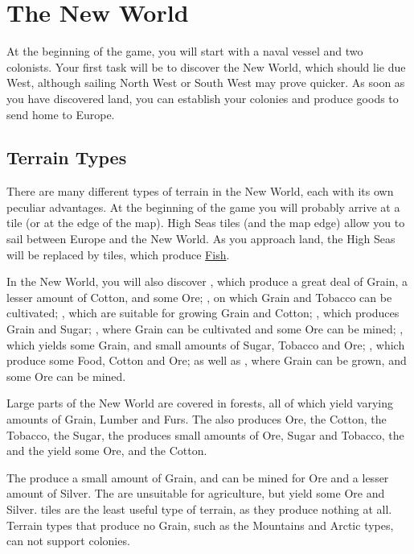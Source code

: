 \documentclass[12pt]{book}
\begin{document}
\hypertarget{The New World}{\chapter{The New World}}

At the beginning of the game, you will start with a naval vessel and
two colonists. Your first task will be to discover the New World,
which should lie due West, although sailing North West or South West
may prove quicker. As soon as you have discovered land, you can
establish your colonies and produce goods to send home to Europe.

\hypertarget{Terrain Types}{\section{Terrain Types}}

There are many different types of terrain in the New World, each with
its own peculiar advantages. At the beginning of the game you will
probably arrive at a  tile (or at the edge of the
map). High Seas tiles (and the map edge) allow you to sail between
Europe and the New World. As you approach land, the High Seas will be
replaced by  tiles, which produce
\hyperlink{Fish}{Fish}.

In the New World, you will also discover , which
produce a great deal of Grain, a lesser amount of Cotton, and some
Ore; , on which Grain and Tobacco can be
cultivated; , which are suitable for growing Grain
and Cotton; , which produces Grain and Sugar;
, where Grain can be cultivated and some Ore can be
mined; , which yields some Grain, and small amounts of
Sugar, Tobacco and Ore; , which produce some Food,
Cotton and Ore; as well as , where Grain can be grown,
and some Ore can be mined.

Large parts of the New World are covered in forests, all of which
yield varying amounts of Grain, Lumber and Furs. The  also produces Ore, the  Cotton, the
 Tobacco, the  Sugar,
the  produces small amounts of Ore, Sugar and
Tobacco, the  and the 
yield some Ore, and the  Cotton.

The  produce a small amount of Grain, and can be mined
for Ore and a lesser amount of Silver. The  are
unsuitable for agriculture, but yield some Ore and Silver.
 tiles are the least useful type of terrain, as they
produce nothing at all. Terrain types that produce no Grain, such as
the Mountains and Arctic types, can not support colonies.
\end{document}
